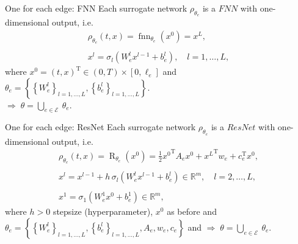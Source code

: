 \documentclass[9pt]{beamer}
\begin{document}
\begin{frame}{One for each edge: FNN}
    Each surrogate network $\rho_{\theta_e}$ is a $FNN$ with one-dimensional output, i.e.  
    \begin{equation*} 
        \label{one_for_each}
        \begin{gathered}
            \rho_{\theta_e} \left(t, x \right) = \operatorname{fnn}_{\theta_e} \left( x^0 \right) = x^L, \\
            \\
            x^l = \sigma_l \left(W^l_e x^{l-1} + b^{l}_e\right), \quad l = 1, \ldots, L,
        \end{gathered} 
    \end{equation*} 
    where $x^0 = \left(t, x\right)^{\mathrm{T}} \in \left(0, T\right) \times \left[0, \ell_e\right]$ and $\theta_e = \left\{ \left\{ W^l_e \right\}_{l = 1, \ldots, L}, \left\{ b^l_e \right\}_{l = 1, \ldots, L} \right\}$. \\
    \vspace{3mm}
    $\Rightarrow \; \theta = \bigcup_{e \in \mathcal{E}} \ \theta_e$.
\end{frame}



\begin{frame}{One for each edge: ResNet}
    Each surrogate network $\rho_{\theta_e}$ is a $ResNet$ with one-dimensional output, i.e.  
    \begin{equation*} 
        \label{Resnet1}
        \begin{gathered}
            \rho_{\theta_e} \left(t, x \right) = \operatorname{R}_{\theta_e}\left(x^0\right) = \frac{1}{2} {x^0}^{\mathrm{T}} A_e x^0 + {x^{L}}^{\mathrm{T}} w_e + c^{\mathrm{T}}_e x^0, \\
            \\
            x^l = x^{l-1} + h \, \sigma_l\left(W^l_e x^{l-1} + b^l_e\right) \in \mathbb{R}^m, \quad l = 2, \ldots, L, \\
            \\
            x^1 = \sigma_1\left(W^1_e x^{0} + b^1_e\right) \in \mathbb{R}^m,
        \end{gathered} 
    \end{equation*}
    where $h > 0$ stepsize (hyperparameter), $x^0$ as before and \\
    $\theta_e = \left\{ \left\{ W^l_e \right\}_{l = 1, \ldots, L}, \left\{ b^l_e \right\}_{l = 1, \ldots, L}, A_e, w_e, c_e \right\}$ and 
    \vspace{3mm}
    $\Rightarrow \; \theta = \bigcup_{e \in \mathcal{E}} \ \theta_e$.
\end{frame}
\end{document}
